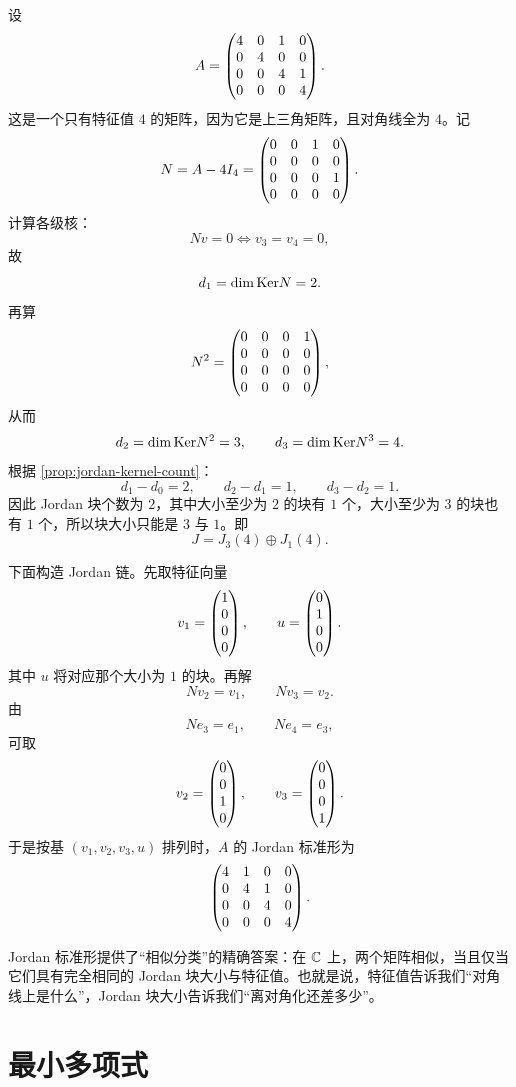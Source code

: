 \begin{example}[一个 \(4\times 4\) 例子]\label{ex:jordan-4x4}
设
\[
A=\begin{pmatrix} 4&0&1&0\\0&4&0&0\\0&0&4&1\\0&0&0&4 \end{pmatrix}.
\]
这是一个只有特征值 \(4\) 的矩阵，因为它是上三角矩阵，且对角线全为 \(4\)。记
\[
N=A-4I_4=\begin{pmatrix} 0&0&1&0\\0&0&0&0\\0&0&0&1\\0&0&0&0 \end{pmatrix}.
\]
计算各级核：
\[
Nv=0 \iff v_3=v_4=0,
\]
故
\[
d_1=\dim\mathrm{Ker} N=2.
\]
再算
\[
N^2=\begin{pmatrix} 0&0&0&1\\0&0&0&0\\0&0&0&0\\0&0&0&0 \end{pmatrix},
\]
从而
\[
d_2=\dim\mathrm{Ker} N^2=3,
\qquad d_3=\dim\mathrm{Ker} N^3=4.
\]
根据 \cref{prop:jordan-kernel-count}：
\[
d_1-d_0=2,
\qquad d_2-d_1=1,
\qquad d_3-d_2=1.
\]
因此 Jordan 块个数为 \(2\)，其中大小至少为 \(2\) 的块有 \(1\) 个，大小至少为 \(3\) 的块也有 \(1\) 个，所以块大小只能是 \(3\) 与 \(1\)。即
\[
J=J_3(4)\oplus J_1(4).
\]

下面构造 Jordan 链。先取特征向量
\[
v_1=\begin{pmatrix} 1\\0\\0\\0 \end{pmatrix},
\qquad u=\begin{pmatrix} 0\\1\\0\\0 \end{pmatrix}.
\]
其中 \(u\) 将对应那个大小为 \(1\) 的块。再解
\[
Nv_2=v_1,
\qquad Nv_3=v_2.
\]
由
\[
Ne_3=e_1,
\qquad Ne_4=e_3,
\]
可取
\[
v_2=\begin{pmatrix} 0\\0\\1\\0 \end{pmatrix},
\qquad v_3=\begin{pmatrix} 0\\0\\0\\1 \end{pmatrix}.
\]
于是按基 \((v_1,v_2,v_3,u)\) 排列时，\(A\) 的 Jordan 标准形为
\[
\begin{pmatrix} 4&1&0&0\\0&4&1&0\\0&0&4&0\\0&0&0&4 \end{pmatrix}.
\]
\end{example}

\begin{remark}
Jordan 标准形提供了“相似分类”的精确答案：在 \(\mathbb{C}\) 上，两个矩阵相似，当且仅当它们具有完全相同的 Jordan 块大小与特征值。也就是说，特征值告诉我们“对角线上是什么”，Jordan 块大小告诉我们“离对角化还差多少”。
\end{remark}

\section{最小多项式}\label{sec:minimal-polynomial}

